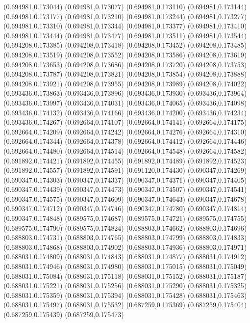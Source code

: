 (0.694981,0.173044)
(0.694981,0.173077)
(0.694981,0.173110)
(0.694981,0.173144)
(0.694981,0.173177)
(0.694981,0.173210)
(0.694981,0.173244)
(0.694981,0.173277)
(0.694981,0.173310)
(0.694981,0.173344)
(0.694981,0.173377)
(0.694981,0.173410)
(0.694981,0.173444)
(0.694981,0.173477)
(0.694981,0.173511)
(0.694981,0.173544)
(0.694208,0.173385)
(0.694208,0.173418)
(0.694208,0.173452)
(0.694208,0.173485)
(0.694208,0.173519)
(0.694208,0.173552)
(0.694208,0.173586)
(0.694208,0.173619)
(0.694208,0.173653)
(0.694208,0.173686)
(0.694208,0.173720)
(0.694208,0.173753)
(0.694208,0.173787)
(0.694208,0.173821)
(0.694208,0.173854)
(0.694208,0.173888)
(0.694208,0.173921)
(0.694208,0.173955)
(0.694208,0.173989)
(0.694208,0.174022)
(0.693436,0.173863)
(0.693436,0.173896)
(0.693436,0.173930)
(0.693436,0.173964)
(0.693436,0.173997)
(0.693436,0.174031)
(0.693436,0.174065)
(0.693436,0.174098)
(0.693436,0.174132)
(0.693436,0.174166)
(0.693436,0.174200)
(0.693436,0.174234)
(0.693436,0.174267)
(0.692664,0.174107)
(0.692664,0.174141)
(0.692664,0.174175)
(0.692664,0.174209)
(0.692664,0.174242)
(0.692664,0.174276)
(0.692664,0.174310)
(0.692664,0.174344)
(0.692664,0.174378)
(0.692664,0.174412)
(0.692664,0.174446)
(0.692664,0.174480)
(0.692664,0.174514)
(0.692664,0.174548)
(0.692664,0.174582)
(0.691892,0.174421)
(0.691892,0.174455)
(0.691892,0.174489)
(0.691892,0.174523)
(0.691892,0.174557)
(0.691892,0.174591)
(0.691120,0.174430)
(0.690347,0.174269)
(0.690347,0.174303)
(0.690347,0.174337)
(0.690347,0.174371)
(0.690347,0.174405)
(0.690347,0.174439)
(0.690347,0.174473)
(0.690347,0.174507)
(0.690347,0.174541)
(0.690347,0.174575)
(0.690347,0.174609)
(0.690347,0.174643)
(0.690347,0.174678)
(0.690347,0.174712)
(0.690347,0.174746)
(0.690347,0.174780)
(0.690347,0.174814)
(0.690347,0.174848)
(0.689575,0.174687)
(0.689575,0.174721)
(0.689575,0.174755)
(0.689575,0.174790)
(0.689575,0.174824)
(0.688803,0.174662)
(0.688803,0.174696)
(0.688803,0.174731)
(0.688803,0.174765)
(0.688803,0.174799)
(0.688803,0.174833)
(0.688803,0.174868)
(0.688803,0.174902)
(0.688803,0.174936)
(0.688803,0.174971)
(0.688031,0.174809)
(0.688031,0.174843)
(0.688031,0.174877)
(0.688031,0.174912)
(0.688031,0.174946)
(0.688031,0.174980)
(0.688031,0.175015)
(0.688031,0.175049)
(0.688031,0.175084)
(0.688031,0.175118)
(0.688031,0.175152)
(0.688031,0.175187)
(0.688031,0.175221)
(0.688031,0.175256)
(0.688031,0.175290)
(0.688031,0.175325)
(0.688031,0.175359)
(0.688031,0.175394)
(0.688031,0.175428)
(0.688031,0.175463)
(0.688031,0.175497)
(0.688031,0.175532)
(0.687259,0.175369)
(0.687259,0.175404)
(0.687259,0.175439)
(0.687259,0.175473)
